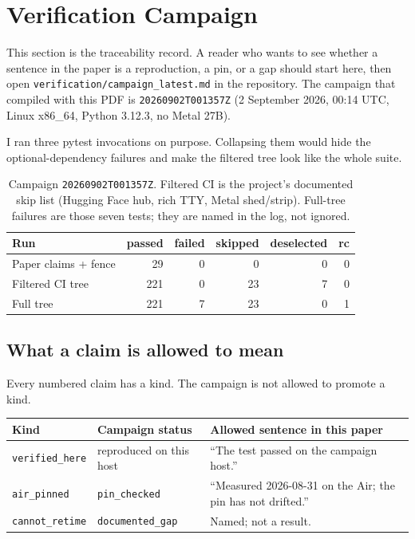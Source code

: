 \section{Verification Campaign}
\label{sec:verify}

This section is the traceability record. A reader who wants to see whether a sentence in the paper is a reproduction, a pin, or a gap should start here, then open \texttt{verification/campaign\_latest.md} in the repository. The campaign that compiled with this PDF is \texttt{20260902T001357Z} (2 September 2026, 00:14 UTC, Linux x86\_64, Python 3.12.3, no Metal 27B).

I ran three pytest invocations on purpose. Collapsing them would hide the optional-dependency failures and make the filtered tree look like the whole suite.

\begin{table}[ht]
\centering
\caption{Campaign \texttt{20260902T001357Z}. Filtered CI is the project's documented skip list (Hugging Face hub, rich TTY, Metal shed/strip). Full-tree failures are those seven tests; they are named in the log, not ignored.}
\label{tab:campaign}
\begin{tabular}{@{}lrrrrr@{}}
\toprule
Run & passed & failed & skipped & deselected & rc \\
\midrule
Paper claims + fence & 29 & 0 & 0 & 0 & 0 \\
Filtered CI tree & 221 & 0 & 23 & 7 & 0 \\
Full tree & 221 & 7 & 23 & 0 & 1 \\
\bottomrule
\end{tabular}
\end{table}

\subsection{What a claim is allowed to mean}

Every numbered claim has a kind. The campaign is not allowed to promote a kind.

\begin{center}
\small
\begin{tabular}{@{}llp{7.4cm}@{}}
\toprule
Kind & Campaign status & Allowed sentence in this paper \\
\midrule
\texttt{verified\_here} & reproduced on this host & ``The test passed on the campaign host.'' \\
\texttt{air\_pinned} & \texttt{pin\_checked} & ``Measured 2026-08-31 on the Air; the pin has not drifted.'' \\
\texttt{cannot\_retime} & \texttt{documented\_gap} & Named; not a result. \\
\bottomrule
\end{tabular}
\end{center}

